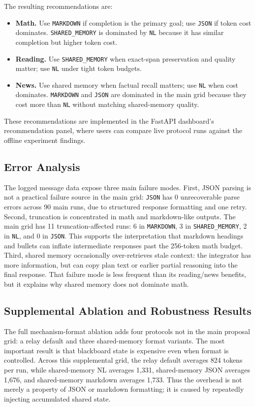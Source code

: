 \documentclass[11pt]{article}
\newcommand{\NL}{\texttt{NL}\xspace}
\newcommand{\MD}{\texttt{MARKDOWN}\xspace}
\newcommand{\JS}{\texttt{JSON}\xspace}
\newcommand{\SM}{\texttt{SHARED\_MEMORY}\xspace}
\begin{document}
The resulting recommendations are:

\begin{itemize}
  \item \textbf{Math.} Use \MD if completion is the primary goal; use \JS if token cost dominates. \SM is dominated by \NL because it has similar completion but higher token cost.
  \item \textbf{Reading.} Use \SM when exact-span preservation and quality matter; use \NL under tight token budgets.
  \item \textbf{News.} Use shared memory when factual recall matters; use \NL when cost dominates. \MD and \JS are dominated in the main grid because they cost more than \NL without matching shared-memory quality.
\end{itemize}

These recommendations are implemented in the FastAPI dashboard's recommendation panel, where users can compare live protocol runs against the offline experiment findings.

\subsection{Error Analysis}

The logged message data expose three main failure modes. First, JSON parsing is not a practical failure source in the main grid: \JS has 0 unrecoverable parse errors across 90 main runs, due to structured response formatting and one retry. Second, truncation is concentrated in math and markdown-like outputs. The main grid has 11 truncation-affected runs: 6 in \MD, 3 in \SM, 2 in \NL, and 0 in \JS. This supports the interpretation that markdown headings and bullets can inflate intermediate responses past the 256-token math budget. Third, shared memory occasionally over-retrieves stale context: the integrator has more information, but can copy plan text or earlier partial reasoning into the final response. That failure mode is less frequent than its reading/news benefits, but it explains why shared memory does not dominate math.

\subsection{Supplemental Ablation and Robustness Results}

The full mechanism-format ablation adds four protocols not in the main proposal grid: a relay default and three shared-memory format variants. The most important result is that blackboard state is expensive even when format is controlled. Across this supplemental grid, the relay default averages 824 tokens per run, while shared-memory NL averages 1,331, shared-memory JSON averages 1,676, and shared-memory markdown averages 1,733. Thus the overhead is not merely a property of JSON or markdown formatting; it is caused by repeatedly injecting accumulated shared state.
\end{document}
